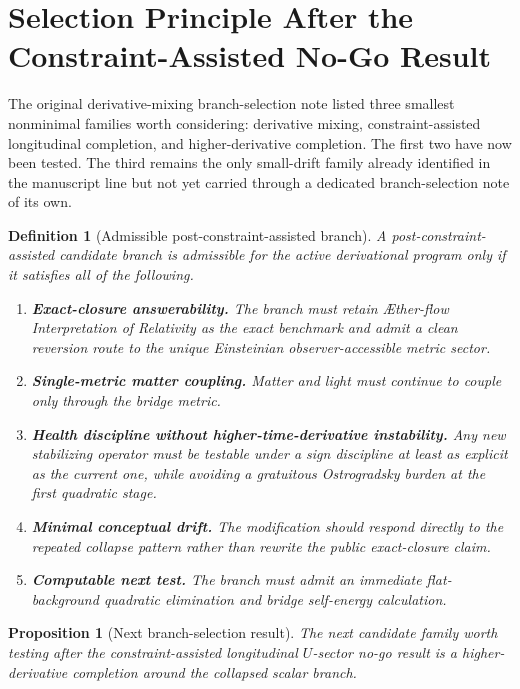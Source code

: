 \documentclass[11pt]{article}
\newcommand{\Aflow}{\AE{}ther-flow}
\newcommand{\TheoryName}{\Aflow{} Interpretation of Relativity}
\newtheorem{definition}{Definition}
\newtheorem{proposition}{Proposition}
\begin{document}
\section{Selection Principle After the Constraint-Assisted No-Go Result}

The original derivative-mixing branch-selection note listed three smallest nonminimal families worth considering: derivative mixing, constraint-assisted longitudinal completion, and higher-derivative completion. The first two have now been tested. The third remains the only small-drift family already identified in the manuscript line but not yet carried through a dedicated branch-selection note of its own.

\begin{definition}[Admissible post-constraint-assisted branch]
A post-constraint-assisted candidate branch is admissible for the active derivational program only if it satisfies all of the following.
\begin{enumerate}
    \item \textbf{Exact-closure answerability.} The branch must retain \TheoryName{} as the exact benchmark and admit a clean reversion route to the unique Einsteinian observer-accessible metric sector.
    \item \textbf{Single-metric matter coupling.} Matter and light must continue to couple only through the bridge metric.
    \item \textbf{Health discipline without higher-time-derivative instability.} Any new stabilizing operator must be testable under a sign discipline at least as explicit as the current one, while avoiding a gratuitous Ostrogradsky burden at the first quadratic stage.
    \item \textbf{Minimal conceptual drift.} The modification should respond directly to the repeated collapse pattern rather than rewrite the public exact-closure claim.
    \item \textbf{Computable next test.} The branch must admit an immediate flat-background quadratic elimination and bridge self-energy calculation.
\end{enumerate}
\end{definition}

\begin{proposition}[Next branch-selection result]
The next candidate family worth testing after the constraint-assisted longitudinal \(U\)-sector no-go result is a higher-derivative completion around the collapsed scalar branch.
\end{proposition}
\end{document}
